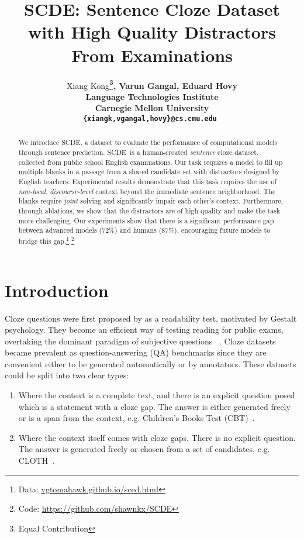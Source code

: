 \documentclass[11pt,a4paper]{article}
\title{
SCDE: Sentence Cloze Dataset with High Quality Distractors From Examinations
}
\author{Xiang Kong\bf{\thanks{\quad Equal Contribution}}, Varun Gangal\footnotemark[1], Eduard Hovy \\
        Language Technologies Institute \\ Carnegie Mellon University \\ {\tt \{xiangk,vgangal,hovy\}@cs.cmu.edu } }
\date{}
\newcommand{\dsname}{\textsc{SCDE}}
\begin{document}
\maketitle
\begin{abstract}
We introduce \dsname, a dataset to evaluate the performance of computational models through sentence prediction. \dsname~is a human-created \emph{sentence} cloze dataset, collected from public school English examinations. Our task requires a model to fill up multiple blanks in a passage from a shared candidate set with distractors designed by English teachers.
Experimental results demonstrate that this task requires the use of \emph{non-local}, \emph{discourse-level} context beyond the immediate sentence neighborhood. The blanks require \emph{joint} solving and significantly impair each other's context. Furthermore, through ablations, we show that the distractors are of high quality and make the task more challenging. Our experiments show that there is a significant performance gap between advanced models (72\%) and humans (87\%), encouraging future models to bridge this gap.\footnote{Data: \url{vgtomahawk.github.io/sced.html}} \footnote{Code: \url{https://github.com/shawnkx/SCDE}}
 \end{abstract}


\section{Introduction}
\label{sec:intro}
Cloze questions were first proposed by  as a readability test, motivated by Gestalt psychology. They become an efficient way of testing reading for public exams, overtaking the dominant paradigm of subjective questions ~\cite{fotos1991cloze,jonz1991cloze}. 
Cloze datasets~\cite{zweig2011microsoft,hermann2015teaching,hill2015goldilocks,paperno2016lambada,onishi2016did,xie2017large} became prevalent as question-answering (QA) benchmarks since they are convenient either to be generated automatically or by annotators.  These datasets could be split into two clear types:
\begin{enumerate}
    \item Where the context is a complete text, and there is an explicit question posed which is a statement with a cloze gap. The answer is either generated freely or is a span from the context, e.g. Children’s  Books Test (CBT)~\cite{hill2015goldilocks}.
    \item Where the context itself comes with cloze gaps. There is no explicit question. The answer is generated freely or chosen from a set of candidates, e.g. CLOTH~\cite{xie2017large}.
\end{enumerate}
\end{document}
